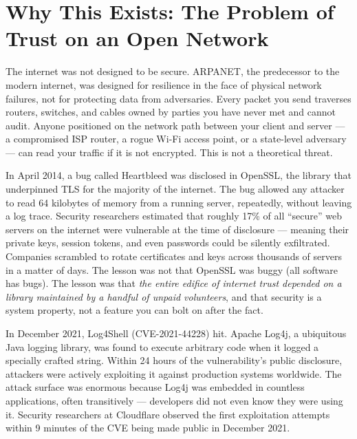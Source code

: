 \documentclass[11pt,a4paper]{article}
\begin{document}
\tableofcontents
\newpage

\section{Why This Exists: The Problem of Trust on an Open Network}

The internet was not designed to be secure. ARPANET, the predecessor to the modern internet, was designed for resilience in the face of physical network failures, not for protecting data from adversaries. Every packet you send traverses routers, switches, and cables owned by parties you have never met and cannot audit. Anyone positioned on the network path between your client and server --- a compromised ISP router, a rogue Wi-Fi access point, or a state-level adversary --- can read your traffic if it is not encrypted. This is not a theoretical threat.

In April 2014, a bug called Heartbleed was disclosed in OpenSSL, the library that underpinned TLS for the majority of the internet. The bug allowed any attacker to read 64 kilobytes of memory from a running server, repeatedly, without leaving a log trace. Security researchers estimated that roughly 17\% of all ``secure'' web servers on the internet were vulnerable at the time of disclosure --- meaning their private keys, session tokens, and even passwords could be silently exfiltrated. Companies scrambled to rotate certificates and keys across thousands of servers in a matter of days. The lesson was not that OpenSSL was buggy (all software has bugs). The lesson was that \textit{the entire edifice of internet trust depended on a library maintained by a handful of unpaid volunteers}, and that security is a system property, not a feature you can bolt on after the fact.

In December 2021, Log4Shell (CVE-2021-44228) hit. Apache Log4j, a ubiquitous Java logging library, was found to execute arbitrary code when it logged a specially crafted string. Within 24 hours of the vulnerability's public disclosure, attackers were actively exploiting it against production systems worldwide. The attack surface was enormous because Log4j was embedded in countless applications, often transitively --- developers did not even know they were using it. Security researchers at Cloudflare observed the first exploitation attempts within 9 minutes of the CVE being made public in December 2021.
\end{document}
